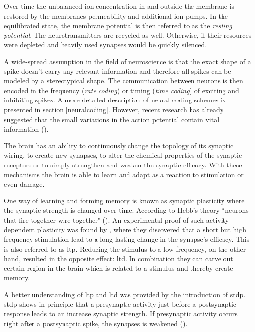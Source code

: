 Over time the unbalanced ion concentration in and outside the membrane is restored by the membranes permeability and additional ion pumps. In the equilibrated state, the membrane potential is then referred to as the \emph{resting potential}. The neurotransmitters are recycled as well. Otherwise, if their resources were depleted and heavily used synapses would be quickly silenced.

A wide-spread assumption in the field of neuroscience is that the exact shape of a spike doesn't carry any relevant information and therefore all spikes can be modeled by a stereotypical shape. The communication between neurons is then encoded in the frequency (\emph{rate coding}) or timing (\emph{time coding}) of exciting and inhibiting spikes. A more detailed description of neural coding schemes is presented in section \ref{neuralcoding}. However, recent research has already suggested that the small variations in the action potential contain vital information (\citealp{debanne2013mechanisms}).

The brain has an ability to continuously change the topology of its synaptic wiring, to create new synapses, to alter the chemical properties of the synaptic receptors or to simply strengthen and weaken the synaptic efficacy. With these mechanisms the brain is able to learn and adapt as a reaction to stimulation or even damage.

One way of learning and forming memory is known as synaptic plasticity where the synaptic strength is changed over time. According to Hebb's theory ``neurons that fire together wire together" (\citealp{hebb1949organization}). An experimental proof of such activity-dependent plasticity was found by \citealp{bliss1973long}, where they discovered that a short but high frequency stimulation lead to a long lasting change in the synapse's efficacy. This is also referred to as \gls{ltp}. Reducing the stimulus to a low frequency, on the other hand, resulted in the opposite effect: \gls{ltd}. In combination they can carve out certain region in the brain which is related  to a stimulus and thereby create memory. 

A better understanding of \gls{ltp} and \gls{ltd} was provided by the introduction of \gls{stdp}. \gls{stdp} shows in principle that a presynaptic activity just before a postsynaptic response leads to an increase synaptic strength. If  presynaptic activity occurs right after a postsynaptic spike, the synapses is weakened (\citealp{poo98stdp}). 


